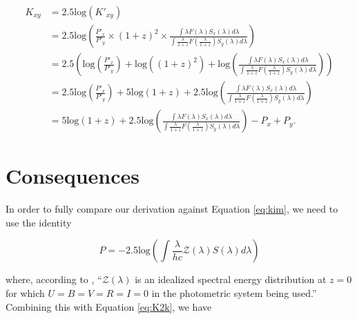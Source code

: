 \documentclass[linenumbers]{aastex631}
\begin{document}
\begin{equation}
\begin{aligned}
\label{eq:K2k}
  K_{xy} &= 2.5\text{log}(K'_{xy}) \\
         &= 2.5\text{log}\left(
            \frac{P'_x}{P'_y} \times (1 + z)^2 \times
            \frac{\int \lambda F(\lambda) S_x(\lambda) d\lambda}
                 {\int \frac{\lambda}{1+z} F\left(\frac{\lambda}{1+z}\right) S_y(\lambda) d\lambda}\right) \\
         &= 2.5 \left(
            \text{log} \left( \frac{P'_x}{P'_y} \right)
            + \text{log}( {(1 + z)^2})
            + \text{log}\left( \frac{\int \lambda F(\lambda) S_x(\lambda) d\lambda}
                   {\int \frac{\lambda}{1+z} F\left(\frac{\lambda}{1+z}\right) S_y(\lambda) d\lambda}
            \right) \right) \\
         &= 2.5 \text{log} \left( \frac{P'_x}{P'_y} \right)
            + 5 \text{log} (1 + z)
            + 2.5 \text{log} \left(
              \frac{\int \lambda F(\lambda) S_x(\lambda) d\lambda}
                   {\int \frac{\lambda}{1+z} F\left(\frac{\lambda}{1+z}\right) S_y(\lambda) d\lambda} \right) \\
         &= 5 \text{log} (1 + z)
            + 2.5 \text{log} \left(
              \frac{\int \lambda F(\lambda) S_x(\lambda) d\lambda}
                   {\int \frac{\lambda}{1+z} F\left(\frac{\lambda}{1+z}\right) S_y(\lambda) d\lambda} \right)
            - P_x + P_y .
\end{aligned}
\end{equation}

\section{Consequences}
\label{sec:consequences}

In order to fully compare our derivation against Equation \ref{eq:kim}, we need
to use the identity

\begin{equation}
  P = -2.5 \text{log} \left( \int \frac{\lambda}{hc} \mathcal{Z}(\lambda) S(\lambda) d\lambda \right)
\end{equation}

\noindent where, according to \citet{kim1996}, ``$\mathcal{Z}(\lambda)$ is an
idealized spectral energy distribution at $z = 0$ for which
$U = B = V = R = I = 0$ in the photometric system being used.'' Combining this
with Equation \ref{eq:K2k}, we have
\end{document}
